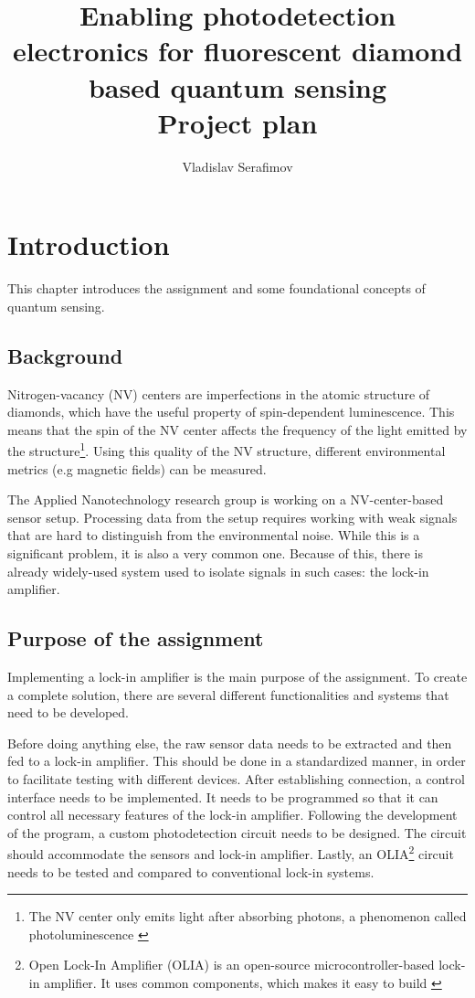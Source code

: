 \documentclass{report}
\title{Enabling photodetection electronics for 
	fluorescent diamond based quantum sensing \\Project plan}
\author{Vladislav Serafimov}
\begin{document}
	\maketitle
	
	\tableofcontents
	
	\chapter{Introduction}
	This chapter introduces the assignment and some foundational concepts of quantum sensing.
	
	\section{Background}
	Nitrogen-vacancy (NV) centers \cite{enwiki:1301369588} are imperfections in the atomic structure of diamonds, which have the useful property of spin-dependent luminescence. This means that the spin of the NV center affects the frequency of the light emitted by the structure\footnote{The NV center only emits light after absorbing photons, a phenomenon called photoluminescence \cite{enwiki:1309081879}}. Using this quality of the NV structure, different environmental metrics (e.g magnetic fields) can be measured. 
	
	The Applied Nanotechnology research group is working on a NV-center-based sensor setup. Processing data from the setup requires working with weak signals that are hard to distinguish from the environmental noise. While this is a significant problem, it is also a very common one. Because of this, there is already widely-used system used to isolate signals in such cases: the lock-in amplifier.
	
	\section{Purpose of the assignment}\label{purpose}
	Implementing a lock-in amplifier is the main purpose of the assignment. To create a complete solution, there are several different functionalities and systems that need to be developed. 
	
	Before doing anything else, the raw sensor data needs to be extracted and then fed to a lock-in amplifier. This should be done in a standardized manner, in order to facilitate testing with different devices. After establishing connection, a control interface needs to be implemented. It needs to be programmed so that it can control all necessary features of the lock-in amplifier. Following the development of the program, a custom photodetection circuit needs to be designed. The circuit should accommodate the sensors and lock-in amplifier. Lastly, an OLIA\footnote{Open Lock-In Amplifier (OLIA) is an open-source microcontroller-based lock-in amplifier. It uses common components, which makes it easy to build \cite{harvie2023olia}} circuit needs to be tested and compared to conventional lock-in systems. 
	
\end{document}
